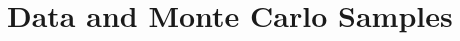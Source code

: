 \begin{comment}
\begin{figure}[!hbt]
  \centering
  \begin{subfigure}[t]{0.54\textwidth}
    \texttt{[image: \\figpath/Chapter2/Higgs\_XS\_8TeV.png]}
    \label{fig:Higgs_XS_8TeV}
  \end{subfigure}
  \begin{subfigure}[t]{0.41\textwidth}
    \texttt{[image: \\figpath/Chapter2/Higgs\_BR\_4fermion.png]}
    \label{fig:Higgs_BR_4fermion}
  \end{subfigure}
  \caption{The Standard Model Higgs production cross sections at 8\tev (left) and WW branching ratios to four fermion final states (right).}
  \label{fig:Higgs_XS_and_BR}
\end{figure}
\end{comment}


\section{Data and Monte Carlo Samples}


